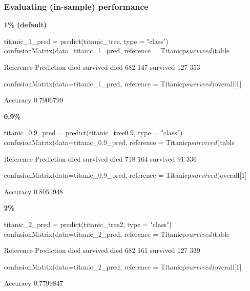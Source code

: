 \documentclass[a4paper]{article}
\begin{document}
\subsubsection{Evaluating (in-sample) performance}
\textbf{1\% (default)}
\begin{Schunk}
\begin{Sinput}
titanic_1_pred = predict(titanic_tree, type = "class")
confusionMatrix(data=titanic_1_pred, reference = Titanicp$survived)$table
\end{Sinput}
\begin{Soutput}
          Reference
Prediction died survived
  died      682      147
  survived  127      353
\end{Soutput}
\begin{Sinput}
confusionMatrix(data=titanic_1_pred, reference = Titanicp$survived)$overall[1]
\end{Sinput}
\begin{Soutput}
 Accuracy 
0.7906799 
\end{Soutput}
\end{Schunk}
\textbf{0.9\%}
\begin{Schunk}
\begin{Sinput}
titanic_0.9_pred = predict(titanic_tree0.9, type = "class")
confusionMatrix(data=titanic_0.9_pred, 
                reference = Titanicp$survived)$table
\end{Sinput}
\begin{Soutput}
          Reference
Prediction died survived
  died      718      164
  survived   91      336
\end{Soutput}
\begin{Sinput}
confusionMatrix(data=titanic_0.9_pred,
                reference = Titanicp$survived)$overall[1]
\end{Sinput}
\begin{Soutput}
 Accuracy 
0.8051948 
\end{Soutput}
\end{Schunk}
\textbf{2\%}
\begin{Schunk}
\begin{Sinput}
titanic_2_pred = predict(titanic_tree2, type = "class")
confusionMatrix(data=titanic_2_pred, 
                reference = Titanicp$survived)$table
\end{Sinput}
\begin{Soutput}
          Reference
Prediction died survived
  died      682      161
  survived  127      339
\end{Soutput}
\begin{Sinput}
confusionMatrix(data=titanic_2_pred,
                reference = Titanicp$survived)$overall[1]
\end{Sinput}
\begin{Soutput}
 Accuracy 
0.7799847 
\end{Soutput}
\end{Schunk}
\end{document}
